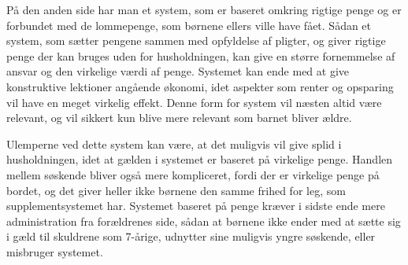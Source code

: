 På den anden side har man et system, som er baseret omkring rigtige penge og er forbundet med de lommepenge, som børnene ellers ville have fået. Sådan et system, som sætter pengene sammen med opfyldelse af pligter, og giver rigtige penge der kan bruges uden for husholdningen, kan give en større fornemmelse af ansvar og den virkelige værdi af penge. Systemet kan ende med at give konstruktive lektioner angående økonomi, idet aspekter som renter og opsparing vil have en meget virkelig effekt. Denne form for system vil næsten altid være relevant, og vil sikkert kun blive mere relevant som barnet bliver ældre.

Ulemperne ved dette system kan være, at det muligvis vil give splid i husholdningen, idet at gælden i systemet er baseret på virkelige penge. Handlen mellem søskende bliver også mere kompliceret, fordi der er virkelige penge på bordet, og det giver heller ikke børnene den samme frihed for leg, som supplementsystemet har. Systemet baseret på penge kræver i sidste ende mere administration fra forældrenes side, sådan at børnene ikke ender med at sætte sig i gæld til skuldrene som 7-årige, udnytter sine muligvis yngre søskende, eller misbruger systemet.
 
